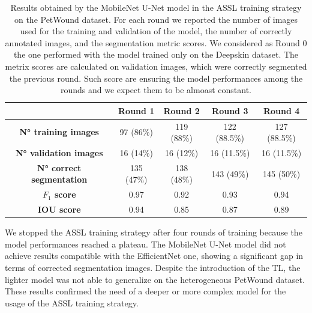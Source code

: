 \documentclass[../main.tex]{subfiles}
\begin{document}
\begin{table}[H]
    \centering
    \begin{tabular}{c|c|c|c|c|}

        \textbf{} & \textbf{Round 1} & \textbf{Round 2} & \textbf{Round 3} & \textbf{Round 4 } \\ \hline
        \textbf{N° training images} & 97 (86\%) & 119 (88\%) & 122 (88.5\%) & 127 (88.5\%)  \\ \hline
        \textbf{N° validation images} & 16 (14\%) & 16 (12\%) & 16 (11.5\%) & 16 (11.5\%)  \\ \hline
        \textbf{N° correct segmentation} & 135 (47\%) & 138 (48\%) & 143 (49\%) & 145 (50\%)  \\ \hline
        \textbf{$F_1$ score} & 0.97 & 0.92 & 0.93 & 0.94  \\ \hline
        \textbf{IOU score} & 0.94 & 0.85 & 0.87 & 0.89  \\ \hline
    \end{tabular}
    \caption{Results obtained by the MobileNet U-Net model in the ASSL training strategy on the PetWound dataset.
    For each round we reported the number of images used for the training and validation of the model, the number of correctly annotated images, and the segmentation metric scores. 
    We considered as Round 0 the one performed with the model trained only on the Deepskin dataset.
The metrix scores are calculated on validation images, which were correctly segmented the previous round. 
Such score are ensuring the model performances among the rounds and we expect them to be almoast constant.}
    \label{tab:results-mob-petwound}
\end{table}

We stopped the ASSL training strategy after four rounds of training because the model performances reached a plateau. The MobileNet U-Net model did not achieve results compatible with the EfficientNet one, showing a significant gap in terms of corrected segmentation images. Despite the introduction of the TL, the lighter model was not able to generalize on the heterogeneous PetWound dataset. These results confirmed the need of a deeper or more complex model for the usage of the ASSL training strategy.
\end{document}
